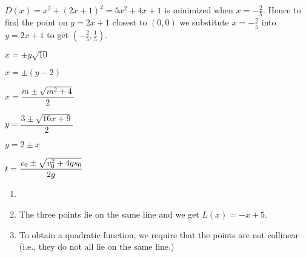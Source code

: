 \begin{exenum}

\item $D(x) = x^2 + (2x+1)^2 = 5x^2+4x+1$ is minimized when $x=-\frac{2}{5}$.  Hence to find the  point on $y=2x+1$ closest to $(0,0)$ we substitute $x = -\frac{2}{5}$ into  $y=2x+1$ to get $\left(-\frac{2}{5}, \frac{1}{5}\right)$.

\end{exenum}

\begin{shortexenum}
\addtocounter{enumi}{2}

\item $x = \pm y\sqrt{10}$ 
\item $x = \pm (y - 2) $ 
\item $x = \dfrac{m \pm \sqrt{m^{2} + 4}}{2}$

\item $y = \dfrac{3 \pm \sqrt{16x + 9}}{2}$ 
\item $y = 2 \pm x$ 
\item $t = \dfrac{v_{\mbox{\scriptsize $0$}} \pm \sqrt{v_{\mbox{\scriptsize $0$}}^{2} + 4gs_{\mbox{\scriptsize $0$}}}}{2g}  $

\end{shortexenum}

\begin{exenum}
\item
\begin{enumerate}

\item 
{}

\addtocounter{enumii}{1}

\item The three points lie on the same line and we get $L(x) = -x+5$.

\item  To obtain a quadratic function, we require that the points are not collinear (i.e., they do not all lie on the same line.)

\end{enumerate}

\end{exenum}
